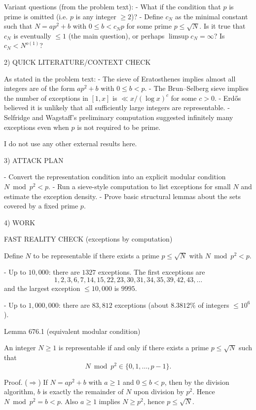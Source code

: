 Variant questions (from the problem text):
- What if the condition that $p$ is prime is omitted (i.e. $p$ is any integer $\ge 2$)?
- Define $c_N$ as the minimal constant such that $N=ap^2+b$ with $0\le b<c_N p$ for some prime $p\le\sqrt N$. Is it true that $c_N$ is eventually $\le 1$ (the main question), or perhaps $\limsup c_N=\infty$? Is $c_N<N^{o(1)}$?

2) QUICK LITERATURE/CONTEXT CHECK

As stated in the problem text:
- The sieve of Eratosthenes implies almost all integers are of the form $ap^2+b$ with $0\le b<p$.
- The Brun--Selberg sieve implies the number of exceptions in $[1,x]$ is $\ll x/(\log x)^c$ for some $c>0$.
- Erd\H{o}s believed it is unlikely that all sufficiently large integers are representable.
- Selfridge and Wagstaff's preliminary computation suggested infinitely many exceptions even when $p$ is not required to be prime.

I do not use any other external results here.

3) ATTACK PLAN

- Convert the representation condition into an explicit modular condition $N\bmod p^2<p$.
- Run a sieve-style computation to list exceptions for small $N$ and estimate the exception density.
- Prove basic structural lemmas about the sets covered by a fixed prime $p$.

4) WORK

FAST REALITY CHECK (exceptions by computation)

Define $N$ to be representable if there exists a prime $p\le\sqrt N$ with $N\bmod p^2<p$.

- Up to $10{,}000$: there are $1327$ exceptions. The first exceptions are
\[
1,2,3,6,7,14,15,22,23,30,31,34,35,39,42,43,\dots
\]
and the largest exception $\le 10{,}000$ is $9995$.

- Up to $1{,}000{,}000$: there are $83{,}812$ exceptions (about $8.3812\%$ of integers $\le 10^6$).

Lemma 676.1 (equivalent modular condition)

An integer $N\ge 1$ is representable if and only if there exists a prime $p\le\sqrt N$ such that
\[
 N\bmod p^2 \in \{0,1,\dots,p-1\}.
\]

Proof.
($\Rightarrow$) If $N=ap^2+b$ with $a\ge 1$ and $0\le b<p$, then by the division algorithm, $b$ is exactly the remainder of $N$ upon division by $p^2$. Hence $N\bmod p^2=b<p$.
Also $a\ge 1$ implies $N\ge p^2$, hence $p\le\sqrt N$.

